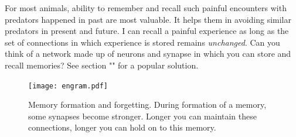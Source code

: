 \documentclass[]{resonance}
\begin{document}
For most animals, ability to remember and recall such painful encounters with
predators happened in past are most valuable. It helps them in avoiding similar
predators in present and future. I can recall a painful experience as long as
the set of connections in which experience is stored remains \emph{unchanged}.
Can you think of a network made up of neurons and synapse in which you can store
and recall memories? See section "" for a popular solution.

\begin{figure}[!t] \caption{Memory formation and forgetting. During formation of
    a memory, some synapses become stronger. Longer you can maintain these
connections, longer you can hold on to this memory.  }\label{fig:engram}
\texttt{[image: engram.pdf]} \end{figure}
\end{document}
